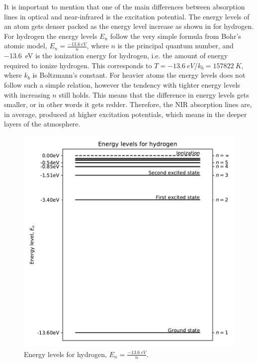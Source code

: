 It is important to mention that one of the main differences between absorption
lines in optical and near-infrared is the excitation potential. The energy
levels of an atom gets denser packed as the energy level increase as shown in
 for hydrogen. For hydrogen the energy levels $E_n$ follow the
very simple formula from Bohr's atomic model, $E_n=\frac{\SI{-13.6}{eV}}{n}$,
where $n$ is the principal quantum number, and \SI{-13.6}{eV} is the ionization
energy for hydrogen, i.e. the amount of energy required to ionize hydrogen. This
corresponds to $T=\SI{-13.6}{eV}/k_b=\SI{157822}{K}$, where $k_b$ is Boltzmann's
constant. For heavier atoms the energy levels does not follow such a simple
relation, however the tendency with tighter energy levels with increasing $n$
still holds. This means that the difference in energy levels gets smaller, or in
other words it gets redder. Therefore, the NIR absorption lines are, in average,
produced at higher excitation potentials, which means in the deeper layers of
the atmosphere.

\begin{figure}[htpb!]
    \centering
    \includegraphics[width=1.0\linewidth]{figures/energyLevels.pdf}
    \caption{Energy levels for hydrogen, $E_n=\frac{\SI{-13.6}{eV}}{n}$.}
    \label{fig:elevel}
\end{figure}


